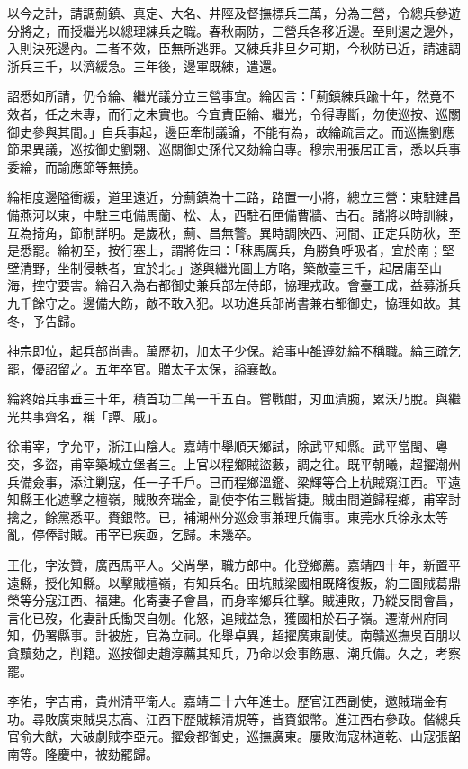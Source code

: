 \begin{pinyinscope}
以今之計，請調薊鎮、真定、大名、井陘及督撫標兵三萬，分為三營，令總兵參遊分將之，而授繼光以總理練兵之職。春秋兩防，三營兵各移近邊。至則遏之邊外，入則決死邊內。二者不效，臣無所逃罪。又練兵非旦夕可期，今秋防已近，請速調浙兵三千，以濟緩急。三年後，邊軍既練，遣還。

詔悉如所請，仍令綸、繼光議分立三營事宜。綸因言：「薊鎮練兵踰十年，然竟不效者，任之未專，而行之未實也。今宜責臣綸、繼光，令得專斷，勿使巡按、巡關御史參與其間。」自兵事起，邊臣牽制議論，不能有為，故綸疏言之。而巡撫劉應節果異議，巡按御史劉翾、巡關御史孫代又劾綸自專。穆宗用張居正言，悉以兵事委綸，而諭應節等無撓。

綸相度邊隘衝緩，道里遠近，分薊鎮為十二路，路置一小將，總立三營：東駐建昌備燕河以東，中駐三屯備馬蘭、松、太，西駐石匣備曹牆、古石。諸將以時訓練，互為掎角，節制詳明。是歲秋，薊、昌無警。異時調陜西、河間、正定兵防秋，至是悉罷。綸初至，按行塞上，謂將佐曰：「秣馬厲兵，角勝負呼吸者，宜於南；堅壁清野，坐制侵軼者，宜於北。」遂與繼光圖上方略，築敵臺三千，起居庸至山海，控守要害。綸召入為右都御史兼兵部左侍郎，協理戎政。會臺工成，益募浙兵九千餘守之。邊備大飭，敵不敢入犯。以功進兵部尚書兼右都御史，協理如故。其冬，予告歸。

神宗即位，起兵部尚書。萬歷初，加太子少保。給事中雒遵劾綸不稱職。綸三疏乞罷，優詔留之。五年卒官。贈太子太保，謚襄敏。

綸終始兵事垂三十年，積首功二萬一千五百。嘗戰酣，刃血漬腕，累沃乃脫。與繼光共事齊名，稱「譚、戚」。

徐甫宰，字允平，浙江山陰人。嘉靖中舉順天鄉試，除武平知縣。武平當閩、粵交，多盜，甫宰築城立堡者三。上官以程鄉賊盜藪，調之往。既平朝曦，超擢潮州兵備僉事，添注剿寇，任一子千戶。已而程鄉溫鑑、梁輝等合上杭賊窺江西。平遠知縣王化遮擊之檀嶺，賊敗奔瑞金，副使李佑三戰皆捷。賊由間道歸程鄉，甫宰討擒之，餘黨悉平。賚銀幣。已，補潮州分巡僉事兼理兵備事。東莞水兵徐永太等亂，停俸討賊。甫宰已疾亟，乞歸。未幾卒。

王化，字汝贊，廣西馬平人。父尚學，職方郎中。化登鄉薦。嘉靖四十年，新置平遠縣，授化知縣。以擊賊檀嶺，有知兵名。田坑賊梁國相既降復叛，約三圖賊葛鼎榮等分寇江西、福建。化寄妻子會昌，而身率鄉兵往擊。賊連敗，乃縱反間會昌，言化已歿，化妻計氏慟哭自刎。化怒，追賊益急，獲國相於石子嶺。遷潮州府同知，仍署縣事。計被旌，官為立祠。化舉卓異，超擢廣東副使。南贛巡撫吳百朋以貪黷劾之，削籍。巡按御史趙淳薦其知兵，乃命以僉事飭惠、潮兵備。久之，考察罷。

李佑，字吉甫，貴州清平衛人。嘉靖二十六年進士。歷官江西副使，邀賊瑞金有功。尋敗廣東賊吳志高、江西下歷賊賴清規等，皆賚銀幣。進江西右參政。偕總兵官俞大猷，大破劇賊李亞元。擢僉都御史，巡撫廣東。屢敗海寇林道乾、山寇張韶南等。隆慶中，被劾罷歸。


\end{pinyinscope}
